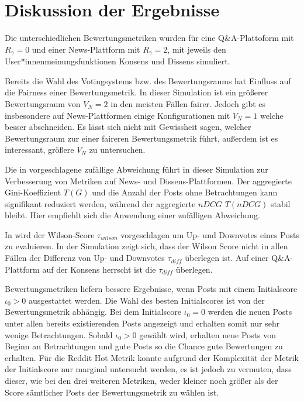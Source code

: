 \chapter{Diskussion der Ergebnisse}


Die unterschiedlichen Bewertungsmetriken wurden für eine Q\&A-Plattoform mit $R_\gamma = 0$ und einer News-Plattform mit $R_\gamma = 2$, mit jeweils den User*innenmeinungsfunktionen Konsens und Dissens simuliert.

Bereits die Wahl des Votingsystems bzw. des Bewertungsraums hat Einfluss auf die Fairness einer Bewertungsmetrik. In dieser Simulation ist ein größerer Bewertungsraum von $V_N = 2$ in den meisten Fällen fairer. Jedoch gibt es insbesondere auf News-Plattformen einige Konfigurationen mit $V_N = 1$ welche besser abschneiden. Es lässt sich nicht mit Gewissheit sagen, welcher Bewertungsraum zur einer faireren Bewertungsmetrik führt, außerdem ist es interessant, größere $V_N$ zu untersuchen.

Die in \cite{Luu} vorgeschlagene zufällige Abweichung führt in dieser Simulation zur Verbesserung von Metriken auf News- und Dissens-Plattformen. Der aggregierte Gini-Koeffizient $T(G)$ und die Anzahl der Posts ohne Betrachtungen kann signifikant reduziert werden, während der aggregierte $nDCG$ $T(nDCG)$ stabil bleibt. Hier empfiehlt sich die Anwendung einer zufälligen Abweichung. 

In \cite{miller} wird der Wilson-Score $\tau_{wilson}$ vorgeschlagen um Up- und Downvotes eines Posts zu evaluieren. In der Simulation zeigt sich, dass der Wilson Score nicht in allen Fällen der Differenz von Up- und Downvotes $\tau_{diff}$ überlegen ist. Auf einer Q\&A-Plattform auf der Konsens herrscht ist die $\tau_{diff}$ überlegen.

Bewertungsmetriken liefern bessere Ergebnisse, wenn Posts mit einem Initialscore $\iota_0 > 0$ ausgestattet werden. Die Wahl des besten Initialscores ist von der Bewertungsmetrik abhängig. Bei dem Initialscore $\iota_0 = 0$ werden die neuen Posts unter allen bereits existierenden Posts angezeigt und erhalten somit nur sehr wenige Betrachtungen. Sobald $\iota_0 > 0$ gewählt wird, erhalten neue Posts von Beginn an Betrachtungen und gute Posts so die Chance gute Bewertungen zu erhalten.
Für die Reddit Hot Metrik konnte aufgrund der Komplexität der Metrik der Initialscore nur marginal untersucht werden, es ist jedoch zu vermuten, dass dieser, wie bei den drei weiteren Metriken, weder kleiner noch größer als der Score sämtlicher Posts der Bewertungsmetrik zu wählen ist.

